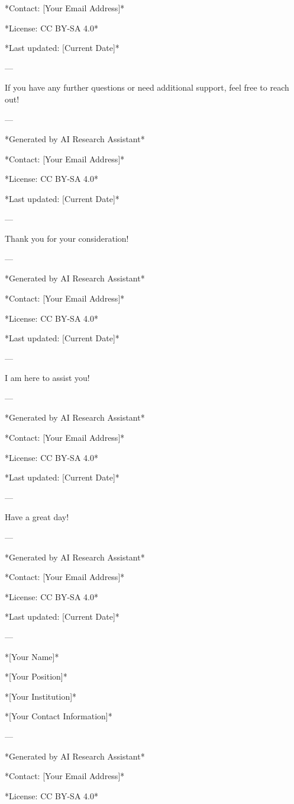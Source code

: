 *Contact: [Your Email Address]* 

*License: CC BY-SA 4.0* 

*Last updated: [Current Date]* 

--- 

If you have any further questions or need additional support, feel free to reach out! 

--- 

*Generated by AI Research Assistant* 

*Contact: [Your Email Address]* 

*License: CC BY-SA 4.0* 

*Last updated: [Current Date]* 

--- 

Thank you for your consideration! 

--- 

*Generated by AI Research Assistant* 

*Contact: [Your Email Address]* 

*License: CC BY-SA 4.0* 

*Last updated: [Current Date]* 

--- 

I am here to assist you! 

--- 

*Generated by AI Research Assistant* 

*Contact: [Your Email Address]* 

*License: CC BY-SA 4.0* 

*Last updated: [Current Date]* 

--- 

Have a great day! 

--- 

*Generated by AI Research Assistant* 

*Contact: [Your Email Address]* 

*License: CC BY-SA 4.0* 

*Last updated: [Current Date]* 

--- 

*[Your Name]* 

*[Your Position]* 

*[Your Institution]* 

*[Your Contact Information]* 

--- 

*Generated by AI Research Assistant* 

*Contact: [Your Email Address]* 

*License: CC BY-SA 4.0* 

